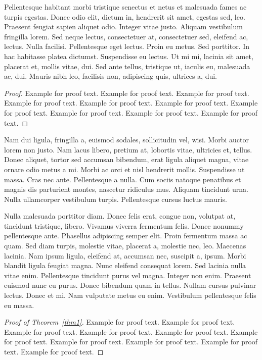 \documentclass[AMS,STIX2COL]{WileyNJD-v2}
\begin{document}
    Pellentesque habitant morbi tristique senectus et netus et malesuada fames ac turpis egestas. Donec odio elit,
    dictum in, hendrerit sit amet, egestas sed, leo. Praesent feugiat sapien aliquet odio. Integer vitae justo. Aliquam
    vestibulum fringilla lorem. Sed neque lectus, consectetuer at, consectetuer sed, eleifend ac, lectus. Nulla facilisi.
    Pellentesque eget lectus. Proin eu metus. Sed porttitor. In hac habitasse platea dictumst. Suspendisse eu lectus. Ut
    mi mi, lacinia sit amet, placerat et, mollis vitae, dui. Sed ante tellus, tristique ut, iaculis eu, malesuada ac, dui.
    Mauris nibh leo, facilisis non, adipiscing quis, ultrices a, dui.

    \begin{proof}
        Example for proof text. Example for proof text. Example for proof text. Example for proof text. Example for proof text. Example for proof text. Example for proof text. Example for proof text. Example for proof text. Example for proof text.
    \end{proof}

    Nam dui ligula, fringilla a, euismod sodales, sollicitudin vel, wisi. Morbi auctor lorem non justo. Nam lacus libero,
    pretium at, lobortis vitae, ultricies et, tellus. Donec aliquet, tortor sed accumsan bibendum, erat ligula aliquet magna,
    vitae ornare odio metus a mi. Morbi ac orci et nisl hendrerit mollis. Suspendisse ut massa. Cras nec ante. Pellentesque
    a nulla. Cum sociis natoque penatibus et magnis dis parturient montes, nascetur ridiculus mus. Aliquam tincidunt
    urna. Nulla ullamcorper vestibulum turpis. Pellentesque cursus luctus mauris.

    Nulla malesuada porttitor diam. Donec felis erat, congue non, volutpat at, tincidunt tristique, libero. Vivamus
    viverra fermentum felis. Donec nonummy pellentesque ante. Phasellus adipiscing semper elit. Proin fermentum massa
    ac quam. Sed diam turpis, molestie vitae, placerat a, molestie nec, leo. Maecenas lacinia. Nam ipsum ligula, eleifend
    at, accumsan nec, suscipit a, ipsum. Morbi blandit ligula feugiat magna. Nunc eleifend consequat lorem. Sed lacinia
    nulla vitae enim. Pellentesque tincidunt purus vel magna. Integer non enim. Praesent euismod nunc eu purus. Donec
    bibendum quam in tellus. Nullam cursus pulvinar lectus. Donec et mi. Nam vulputate metus eu enim. Vestibulum
    pellentesque felis eu massa.

    \begin{proof}[Proof of Theorem~\ref{thm1}]
        Example for proof text. Example for proof text. Example for proof text. Example for proof text. Example for proof text. Example for proof text. Example for proof text. Example for proof text. Example for proof text. Example for proof text.
    \end{proof}
\end{document}
